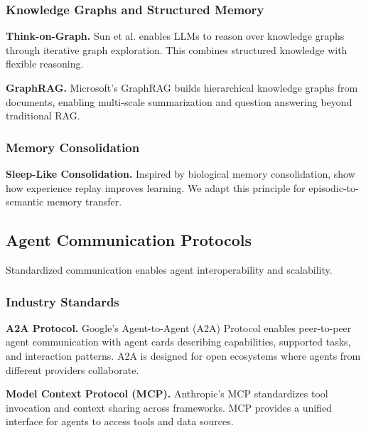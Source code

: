 \documentclass{article}
\theoremstyle{plain}
\theoremstyle{definition}
\theoremstyle{remark}
\begin{document}
\subsubsection{Knowledge Graphs and Structured Memory}

\textbf{Think-on-Graph.} Sun et al. \citep{sun2024thinkongraph} enables LLMs to reason over knowledge graphs through iterative graph exploration. This combines structured knowledge with flexible reasoning.

\textbf{GraphRAG.} Microsoft's GraphRAG \citep{edge2024graphrag} builds hierarchical knowledge graphs from documents, enabling multi-scale summarization and question answering beyond traditional RAG.

\subsubsection{Memory Consolidation}

\textbf{Sleep-Like Consolidation.} Inspired by biological memory consolidation, \citet{schrittwieser2020mastering} show how experience replay improves learning. We adapt this principle for episodic-to-semantic memory transfer.

\subsection{Agent Communication Protocols}
\label{sec:related_protocols}

Standardized communication enables agent interoperability and scalability.

\subsubsection{Industry Standards}

\textbf{A2A Protocol.} Google's Agent-to-Agent (A2A) Protocol \citep{google2025a2a} enables peer-to-peer agent communication with agent cards describing capabilities, supported tasks, and interaction patterns. A2A is designed for open ecosystems where agents from different providers collaborate.

\textbf{Model Context Protocol (MCP).} Anthropic's MCP \citep{anthropic2024mcp} standardizes tool invocation and context sharing across frameworks. MCP provides a unified interface for agents to access tools and data sources.
\end{document}
